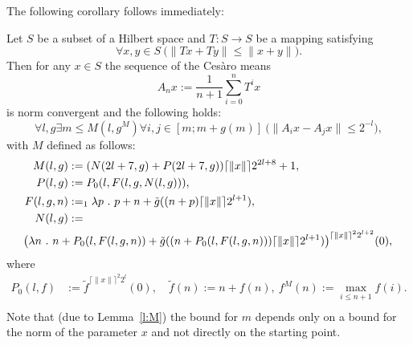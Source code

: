 The following corollary follows immediately:
\begin{cor} \label{c:fin21}
Let $S$ be a subset of a Hilbert space and $T:S\to S$
be a mapping satisfying
\[
\forall x,y\in S\ \big(\| Tx + Ty \| \leq \|x + y\|\big).
\]
Then for any $x\in S$ the sequence of the Ces{\`a}ro means
\[
A_nx:=\frac{1}{n+1}\sum^{n}_{i=0} T^i x
\]
is norm convergent and the following holds:
\[
\forall l,g \exists m\leq M(l,g^M)\forall i,j\in[m;m+g(m)]\ \big( \|A_{i}x-A_{j}x\|\leq 2^{-l}\big ),
\]
with $M$ defined as follows:
\begin{align*}
M(l,g)&:=(N( 2l+7, g) + P( 2l+7, g)){\lceil \|x\| \rceil}2^{2l+8}+1,\\
P(l,g)&:=P_0(l,F(l,g,N(l,g))),\\
F(l,g,n) &:=_1 \lambda p\ .\ p+n+\tilde g((n + p){\lceil \|x\| \rceil}2^{l+1}),\\
N(l,g)&:=\\
&\hspace{-40pt}\big({\lambda n\ .\ n+P_0(l,F(l,g,n))+\tilde g((n + P_0(l,F(l,g,n))){\lceil \|x\| \rceil}2^{l+1}) } \big)^{{\lceil \|x\| \rceil}^22^{l+2}}(0), \\
\end{align*}
where
\begin{align*}
 P_0(l,f)&:=\tilde f^{ {\lceil \|x\| \rceil}^2 2^l}(0),\quad \tilde f(n):=n+f(n),\ f^M(n):=\max_{i\leq n+1} f(i).\\
\end{align*}
Note that (due to Lemma~\ref{l:M}) the bound for $m$ depends only on a bound for the norm of the
parameter $x$ and not directly on the starting point.
\end{cor}


